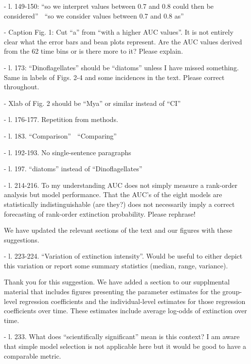 \documentclass[12pt,letterpaper]{article}
\begin{document}
\begin{refsection}
\begin{bfseries}
  - l. 149-150: “so we interpret values between 0.7 and 0.8 could then be considered”  “so we consider values between   0.7 and 0.8  as” 

  - Caption Fig. 1: Cut “a” from “with a higher AUC values”. It is not entirely clear what the error bars and bean plots represent. Are the AUC values derived from the 62 time bins or is there more to it? Please explain.

  - l. 173: “Dinoflagellates” should be “diatoms” unless I have missed something. Same in labels of Figs. 2-4 and some incidences in the text. Please correct throughout.

  - Xlab of Fig. 2 should be “Mya” or similar instead of “CI”

  - l. 176-177. Repetition from methods.

  - l. 183. “Comparison”  “Comparing”

  - l. 192-193. No single-sentence paragraphs

  - l. 197. “diatoms” instead of “Dinoflagellates”

  - l. 214-216. To my understanding AUC does not simply measure a rank-order analysis but model performance. That the AUC’s of the eight models are statistically indistinguishable (are they?) does not necessarily imply a correct forecasting of rank-order extinction probability.  Please rephrase!
\end{bfseries}

We have updated the relevant sections of the text and our figures with these suggestions.

\begin{bfseries}
  - l. 223-224. “Variation of extinction intensity”. Would be useful to either depict this variation or report some summary statistics (median, range, variance).
\end{bfseries}

Thank you for this suggestion. We have added a section to our supplmental material that includes figures presenting the parameter estimates for the group-level regression coefficients and the individual-level estimates for those regression coefficients over time. These estimates include average log-odds of extinction over time.

\begin{bfseries}
  - l. 233. What does “scientifically significant” mean is this context? I am aware that simple model selection is not applicable here but it would be good to have a comparable metric.
\end{bfseries}


\end{refsection}
\end{document}
